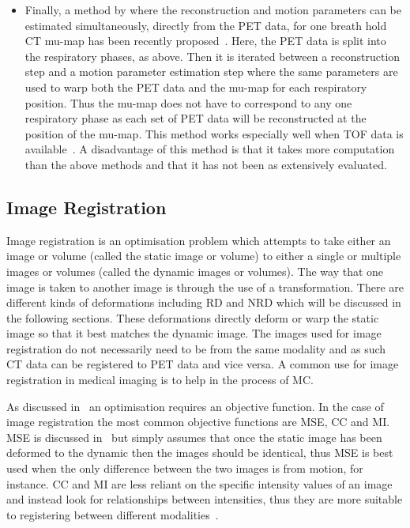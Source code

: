 \begin{itemize}
                \item Finally, a method by where the reconstruction and motion parameters can be estimated simultaneously, directly from the \gls{PET} data, for one breath hold \gls{CT} \gls{mu-map} has been recently proposed~. Here, the \gls{PET} data is split into the respiratory phases, as above. Then it is iterated between a reconstruction step and a motion parameter estimation step where the same parameters are used to warp both the \gls{PET} data and the \gls{mu-map} for each respiratory position. Thus the \gls{mu-map} does not have to correspond to any one respiratory phase as each set of \gls{PET} data will be reconstructed at the position of the \gls{mu-map}. This method works especially well when \gls{TOF} data is available~. A disadvantage of this method is that it takes more computation than the above methods and that it has not been as extensively evaluated.
            \end{itemize}
    
        
    
        \subsection{Image Registration} \label{sec:image_registration}
            Image registration is an optimisation problem which attempts to take either an image or volume (called the static image or volume) to either a single or multiple images or volumes (called the dynamic images or volumes). The way that one image is taken to another image is through the use of a transformation. There are  different kinds of deformations including \gls{RD} and \gls{NRD} which will be discussed in the following sections. These deformations directly deform or warp the static image so that it best matches the dynamic image. %
            The images used for image registration do not necessarily need to be from the same modality and as such \gls{CT} data can be registered to \gls{PET} data and vice versa. A common use for image registration in medical imaging is to help in the process of \gls{MC}.
            
            As discussed in~ an optimisation requires an objective function. In the case of image registration the most common objective functions are \gls{MSE}, \gls{CC} and \gls{MI}. \gls{MSE} is discussed in~ but simply assumes that once the static image has been deformed to the dynamic then the images should be identical, thus \gls{MSE} is best used when the only difference between the two images is from motion, for instance. \gls{CC} and \gls{MI} are less reliant on the specific intensity values of an image and instead look for relationships between intensities, thus they are more suitable to registering between different modalities~.
            
